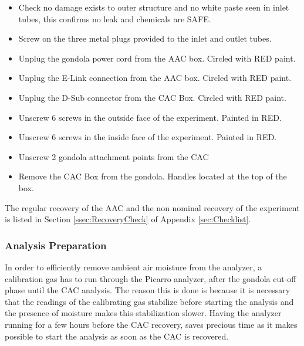 \begin{itemize}
    \item Check no damage exists to outer structure and no white paste seen in inlet tubes, this confirms no leak and chemicals are SAFE.
    \item Screw on the three metal plugs provided to the inlet and outlet tubes.
    \item Unplug the gondola power cord from the AAC box. Circled with RED paint.
    \item Unplug the E-Link connection from the AAC box. Circled with RED paint.
    \item Unplug the D-Sub connector from the CAC Box. Circled with RED paint.
    \item Unscrew 6 screws in the outside face of the experiment. Painted in RED.
    \item Unscrew 6 screws in the inside face of the experiment. Painted in RED.
    \item Unscrew 2 gondola attachment points from the CAC
    \item Remove the CAC Box from the gondola. Handles located at the top of the box. 
\end{itemize}

The regular recovery of the AAC and the non nominal recovery of the experiment is listed in Section \ref{ssec:RecoveryCheck} of Appendix \ref{sec:Checklist}.



\subsubsection{Analysis Preparation}

In order to efficiently remove ambient air moisture from the analyzer, a calibration gas has to run through the Picarro analyzer, after the gondola cut-off phase until the CAC analysis. The reason this is done is because it is necessary that the readings of the calibrating gas stabilize before starting the analysis and the presence of moisture makes this stabilization slower. Having the analyzer running for a few hours before the CAC recovery, saves precious time as it makes possible to start the analysis as soon as the CAC is recovered. 



